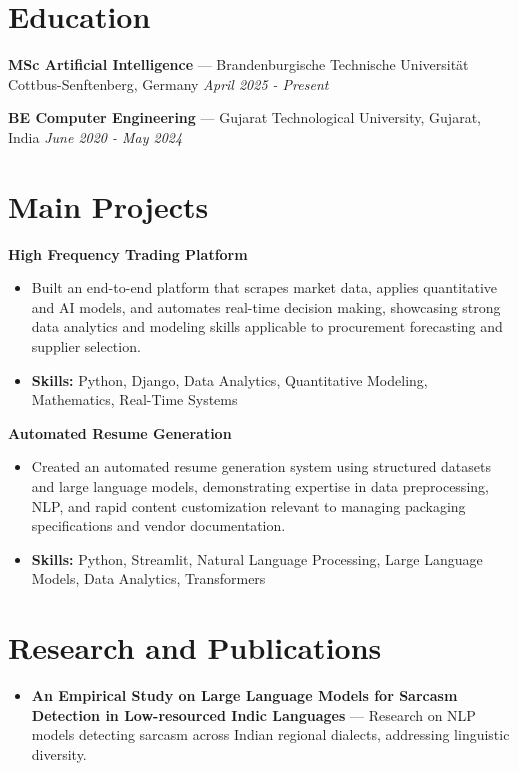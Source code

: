\documentclass[a4paper,10pt]{article}
\begin{document}
\section*{Education}
\textbf{MSc Artificial Intelligence} — Brandenburgische Technische Universität Cottbus-Senftenberg, Germany \hfill \textit{April 2025 - Present}\par
\vspace{1.5pt}
\textbf{BE Computer Engineering} — Gujarat Technological University, Gujarat, India \hfill \textit{June 2020 - May 2024}\par

\section*{Main Projects}
\textbf{High Frequency Trading Platform}\par
\vspace{1pt}
\begin{itemize}
  \item Built an end-to-end platform that scrapes market data, applies quantitative and AI models, and automates real-time decision making, showcasing strong data analytics and modeling skills applicable to procurement forecasting and supplier selection.
  \item \textbf{Skills:} Python, Django, Data Analytics, Quantitative Modeling, Mathematics, Real-Time Systems
\end{itemize}
\vspace{3pt}
\textbf{Automated Resume Generation}\par
\vspace{1pt}
\begin{itemize}
  \item Created an automated resume generation system using structured datasets and large language models, demonstrating expertise in data preprocessing, NLP, and rapid content customization relevant to managing packaging specifications and vendor documentation.
  \item \textbf{Skills:} Python, Streamlit, Natural Language Processing, Large Language Models, Data Analytics, Transformers
\end{itemize}

\section*{Research and Publications}
\begin{itemize}
\item \textbf{An Empirical Study on Large Language Models for Sarcasm Detection in Low-resourced Indic Languages} — Research on NLP models detecting sarcasm across Indian regional dialects, addressing linguistic diversity.
\end{itemize}
\end{document}
